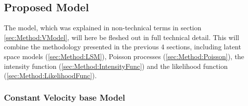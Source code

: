 \subsection{Proposed Model}
\label{sec:Method:ProposedModel}

The model, which was explained in non-technical terms in section \ref{sec:Method:VModel}, will here be fleshed out in full technical detail.
This will combine the methodology presented in the previous 4 sections, including latent space models (\ref{sec:Method:LSM}), Poisson processes (\ref{sec:Method:Poisson}), the intensity function (\ref{sec:Method:IntensityFunc}) and the likelihood function (\ref{sec:Method:LikelihoodFunc}).


\subsubsection{Constant Velocity base Model}
\label{sec:Method:ProposedModel:ConstantVelocityModel}

